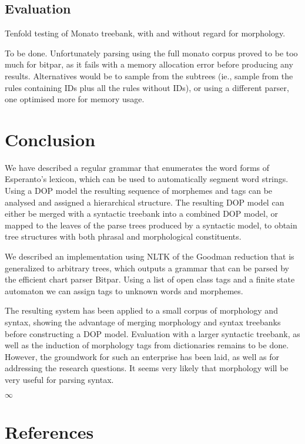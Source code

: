\documentclass[10pt,a4paper]{article}
\begin{document}
\subsection{Evaluation}

Tenfold testing of Monato treebank, with and without regard for
morphology.

To be done. Unfortunately parsing using the full monato corpus proved to be
too much for bitpar, as it fails with a memory allocation error before
producing any results. Alternatives would be to sample from the subtrees (ie.,
sample from the rules containing IDs plus all the rules without IDs), or using
a different parser, one optimised more for memory usage.


\section{Conclusion}

We have described a regular grammar that enumerates the word forms of
Esperanto's lexicon, which can be used to automatically segment word strings.
Using a DOP model the resulting sequence of morphemes and tags can be analysed
and assigned a hierarchical structure. The resulting DOP model can either be
merged with a syntactic treebank into a combined DOP model, or mapped to the
leaves of the parse trees produced by a syntactic model, to obtain tree
structures with both phrasal and morphological constituents.

We described an implementation using NLTK of the Goodman reduction that is
generalized to arbitrary trees, which outputs a grammar that can be parsed by
the efficient chart parser Bitpar. Using a list of open class tags and a
finite state automaton we can assign tags to unknown words and
morphemes.

The resulting system has been applied to a small corpus of morphology and
syntax, showing the advantage of merging morphology and syntax treebanks
before constructing a DOP model. Evaluation with a larger syntactic treebank,
as well as the induction of morphology tags from dictionaries remains to be
done. However, the groundwork for such an enterprise has been laid, as well as
for addressing the research questions. It seems very likely that morphology
will be very useful for parsing syntax.

\begin{center}
$\infty$
\end{center}

\section{References}
\end{document}
